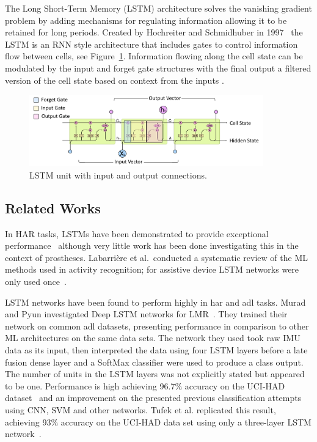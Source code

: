 The Long Short-Term Memory (LSTM) architecture solves the vanishing gradient problem by adding mechanisms for regulating information allowing it to be retained for long periods. Created by Hochreiter and Schmidhuber in 1997~\cite{Hochreiter1997} the LSTM is an RNN style architecture that includes gates to control information flow between cells, see Figure~\ref{fig:lstm_unit}. Information flowing along the cell state can be modulated by the input and forget gate structures with the final output a filtered version of the cell state based on context from the inputs \cite{Olah2015}.

\begin{figure}[!hbt]
    \centering
    \includegraphics[width=0.9\textwidth]{content/4-LSTM_Behaviour/lstm/lstm_internal_operation.pdf}
    \caption{LSTM unit with input and output connections.}
    \label{fig:lstm_unit}
\end{figure}

\subsection{Related Works}
\label{sec:related_work}
In HAR tasks, LSTMs have been demonstrated to provide exceptional performance~\cite{Murad2017} although very little work has been done investigating this in the context of prostheses. Labarri\`ere et al.~conducted a systematic review of the ML methods used in activity recognition; for assistive device LSTM networks were only used once~\cite{Labarriere2020}.

LSTM networks have been found to perform highly in \acrshort{har} and \acrfull{adl} tasks. Murad and Pyun investigated Deep LSTM networks for LMR~\cite{Murad2017}. They trained their network on common \acrshort{adl} datasets, presenting performance in comparison to other ML architectures on the same data sets. The network they used took raw IMU data as its input, then interpreted the data using four LSTM layers before a late fusion dense layer and a SoftMax classifier were used to produce a class output. The number of units in the LSTM layers was not explicitly stated but appeared to be one. Performance is high achieving 96.7\% accuracy on the UCI-HAD dataset~\cite{Anguita2013} and an improvement on the presented previous classification attempts using CNN, SVM and other networks. Tufek et al. replicated this result, achieving 93\% accuracy on the UCI-HAD data set using only a three-layer LSTM network~\cite{Tufek2020}.

